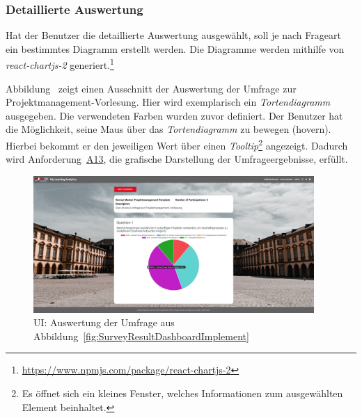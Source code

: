 \subsubsection*{Detaillierte Auswertung}
Hat der Benutzer die detaillierte Auswertung ausgewählt, soll je nach Frageart ein bestimmtes Diagramm erstellt werden.
Die Diagramme werden mithilfe von \emph{react-chartjs-2} generiert.\footnote{\url{https://www.npmjs.com/package/react-chartjs-2}}

Abbildung~ zeigt einen Ausschnitt der Auswertung der Umfrage zur Projektmanagement-Vorlesung.
Hier wird exemplarisch ein \emph{Tortendiagramm} ausgegeben.
Die verwendeten Farben wurden zuvor definiert.
Der Benutzer hat die Möglichkeit, seine Maus über das \emph{Tortendiagramm} zu bewegen (hovern).
Hierbei bekommt er den jeweiligen Wert über einen \emph{Tooltip}\footnote{Es öffnet sich ein kleines Fenster, welches Informationen zum ausgewählten Element beinhaltet.} angezeigt.
Dadurch wird Anforderung~\hyperref[Anf:A13]{A13}, die grafische Darstellung der Umfrageergebnisse, erfüllt.

\begin{figure}[!htb]
	\centering
	\includegraphics[width=0.95\textwidth, keepaspectratio]{img/client/SurveyResultDetail2.png}
	\captionsetup{justification=centering, format=plain}
	\caption[\acl{UI}: Auswertung der Umfrage]{\acl{UI}: Auswertung der Umfrage aus Abbildung~\vref{fig:SurveyResultDashboardImplement} \\ \quelleScreenshot}
	\label{fig:SurveyResultDetailImplement}
\end{figure}
